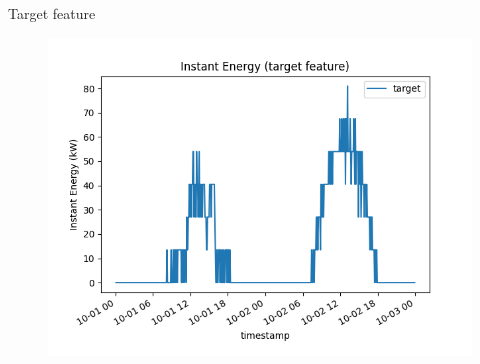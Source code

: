 \begin{frame}{Target feature}
    \begin{figure}
        \centering
        \includegraphics[height=.87\textheight]{sections/2_preprocessing/imgs/targetfeature.png}
    \end{figure}
\end{frame}
